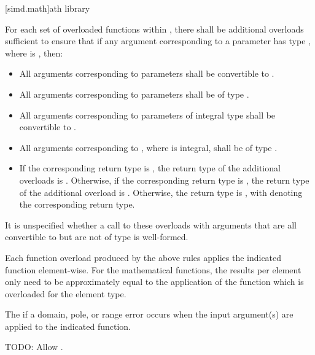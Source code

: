 [simd.math]{\texorpdfstring{ath}{simd math} library}

\pnum
For each set of overloaded functions within , there shall be additional overloads sufficient to ensure that if any argument corresponding to a  parameter has type , where  is , then:
\begin{itemize}
  \item All arguments corresponding to  parameters shall be convertible to .
  \item All arguments corresponding to  parameters shall be of type .
  \item All arguments corresponding to parameters of integral type  shall be convertible to .
  \item All arguments corresponding to , where  is integral, shall be of type .
  \item If the corresponding return type is , the return type of the additional overloads is . Otherwise, if the corresponding return type is , the return type of the additional overload is . Otherwise, the return type is , with  denoting the corresponding return type.
\end{itemize}
It is unspecified whether a call to these overloads with arguments that are all convertible to  but are not of type  is well-formed.

\pnum
Each function overload produced by the above rules applies the indicated  function element-wise. For the mathematical functions, the results per element only need to be approximately equal to the application of the function which is overloaded for the element type.

\pnum
The  if a domain, pole, or range error occurs when the input argument(s) are applied to the indicated  function.

\begin{wgBAdd}
  \pnum
  TODO: Allow .
\end{wgBAdd}

